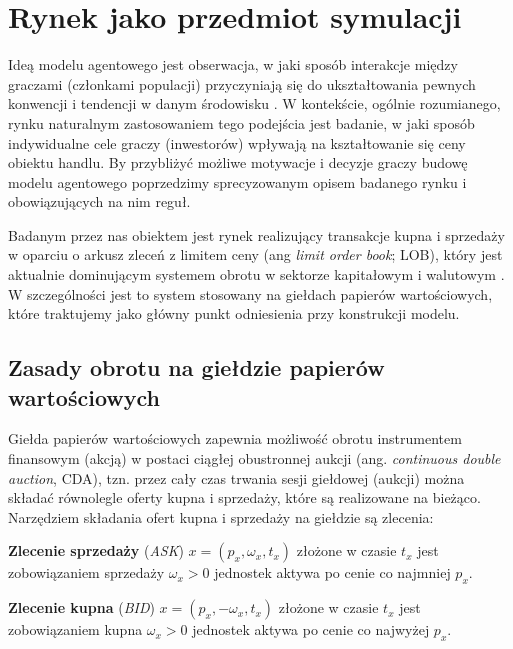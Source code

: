 \chapter{Rynek jako przedmiot symulacji}

Ideą modelu agentowego jest obserwacja, w jaki sposób interakcje między graczami (członkami populacji) przyczyniają się do ukształtowania pewnych konwencji i tendencji w danym środowisku \cite{MAS}. W kontekście, ogólnie rozumianego, rynku naturalnym zastosowaniem tego podejścia jest badanie, w jaki sposób indywidualne cele graczy (inwestorów) wpływają na kształtowanie się ceny obiektu handlu. By przybliżyć możliwe motywacje i decyzje graczy budowę modelu agentowego poprzedzimy sprecyzowanym opisem badanego rynku i obowiązujących na nim reguł. 

Badanym przez nas obiektem jest rynek realizujący transakcje kupna i sprzedaży w oparciu o arkusz zleceń z limitem ceny (ang \textit{limit order book}; LOB), który jest aktualnie dominującym systemem obrotu w sektorze kapitałowym i walutowym \cite{gould2013limit}. W szczególności jest to system stosowany na giełdach papierów wartościowych, które traktujemy jako główny punkt odniesienia przy konstrukcji modelu. 

\section{Zasady obrotu na giełdzie papierów wartościowych} 

Giełda papierów wartościowych zapewnia możliwość obrotu instrumentem finansowym (akcją) w postaci ciągłej obustronnej aukcji (ang. \textit{continuous double auction}, CDA)\cite{wellmanagents}, tzn. przez cały czas trwania sesji giełdowej (aukcji) można składać równolegle oferty kupna i sprzedaży, które są realizowane na bieżąco. Narzędziem składania ofert kupna i sprzedaży na giełdzie są zlecenia\cite{gould2013limit}: 

\begin{definition}\label{def:limitask}
\textbf{Zlecenie sprzedaży} (\textit{ASK}) $x = (p_x, \omega_x, t_x)$ złożone w czasie $t_x$ jest zobowiązaniem sprzedaży $\omega_x>0$ jednostek aktywa po cenie co najmniej $p_x$.
\end{definition}
\begin{definition}\label{def:limitbid}
\textbf{Zlecenie kupna} (\textit{BID}) $x = (p_x, -\omega_x, t_x)$ złożone w czasie $t_x$ jest zobowiązaniem kupna $\omega_x>0$ jednostek aktywa po cenie co najwyżej $p_x$.
\end{definition}

